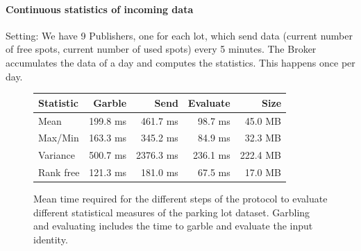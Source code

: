 \paragraph{Continuous statistics of incoming data}



Setting: We have 9 Publishers, one for each lot, which send data (current
number of free spots, current number of used spots) every 5 minutes.  The
Broker accumulates the data of a day and computes the statistics.  This
happens once per day.



\begin{figure}
    \begin{tabular}{l*{3}{r}r}
    \textbf{Statistic}  & \textbf{Garble} & \textbf{Send} & \textbf{Evaluate} & \textbf{Size} \\
    \hline
    Mean       & 199.8 ms & 461.7 ms & 98.7  ms & 45.0 MB \\
    Max/Min    & 163.3 ms & 345.2 ms & 84.9  ms & 32.3 MB \\
    Variance   & 500.7 ms & 2376.3 ms & 236.1 ms & 222.4 MB \\
    \hline
    Rank free  & 121.3 ms & 181.0 ms & 67.5 ms & 17.0 MB \\
    \end{tabular}
    \caption{Mean time required for the different steps of the protocol to
    evaluate different statistical measures of the parking lot dataset.
    Garbling and evaluating includes the time to garble and evaluate the input
    identity.}
    \label{stats-times}
\end{figure}

